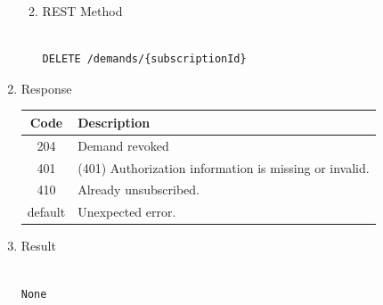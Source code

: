 \begin{enumerate}
\begin{enumerate}
\begin{table}[H]
\begin{center}
\begin{tabular}{|p{3cm}|l|p{3cm}|p{3cm}|p{4cm}|}
\hline

\end{tabular}
\end{center}

\end{table}

\item REST Method

\begin{tcolorbox}[boxrule=0pt, frame empty]
\begin{verbatim} 

DELETE /demands/{subscriptionId}

\end{verbatim}
\end{tcolorbox}

\end{enumerate}

\item Response

\begin{table}[H]
\footnotesize

\begin{center}
\begin{tabular}{|c|l|} 
\hline
\rowcolor{lightgray}	Code 		& 	Description \\
\hline
204	 		&	Demand revoked \\
\hline
401			&	(401) Authorization information is missing or invalid. \\
\hline
410			&	Already unsubscribed. \\
\hline
default		&	Unexpected error. \\
\hline
\end{tabular}
\end{center}

\end{table}

\item Result

\begin{tcolorbox}[boxrule=0pt, frame empty]
\begin{verbatim}

None

\end{verbatim}
\end{tcolorbox}



\end{enumerate}
